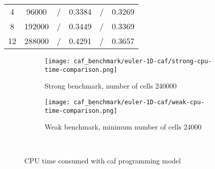 \begin{table}[!ht]
\begin{subtable}[b]{0.80\textwidth}
{\begin{tabular}{cccccc}
      4                              & 96000                 & /             & 0.3384          & /                 & 0.3269              \\
      8                              & 192000                & /             & 0.3449          & /                 & 0.3369              \\
      12                             & 288000                & /             & 0.4291          & /                 & 0.3657              \\
      \hline
    \end{tabular}}
  \end{subtable}
\end{table}

\begin{figure}[!ht]
  \centering
  \begin{subfigure}[b]{0.40\textwidth}
    \centering
    \texttt{[image: caf\_benchmark/euler-1D-caf/strong-cpu-time-comparison.png]}
    \caption{Strong benchmark, number of cells 240000}\label{fig:strong-cpu-time-caf}
  \end{subfigure}\quad%
  \begin{subfigure}[b]{0.40\textwidth}
    \centering
    \texttt{[image: caf\_benchmark/euler-1D-caf/weak-cpu-time-comparison.png]}
    \caption{Weak benchmark, minimum number of cells 24000}\label{fig:weak-cpu-time-caf}
  \end{subfigure}\\
  \caption{CPU time consumed with caf programming model}\label{fig:cpu-time-caf}
\end{figure}

